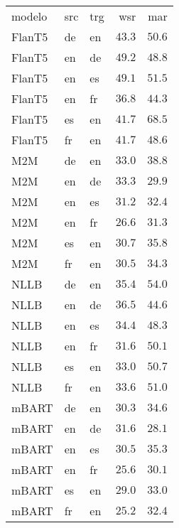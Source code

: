 \begin{tabular}{lllrr}
modelo & src & trg & wsr & mar \\
FlanT5 & de & en & $43.3$ & $50.6$ \\
FlanT5 & en & de & $49.2$ & $48.8$ \\
FlanT5 & en & es & $49.1$ & $51.5$ \\
FlanT5 & en & fr & $36.8$ & $44.3$ \\
FlanT5 & es & en & $41.7$ & $68.5$ \\
FlanT5 & fr & en & $41.7$ & $48.6$ \\
M2M & de & en & $33.0$ & $38.8$ \\
M2M & en & de & $33.3$ & $29.9$ \\
M2M & en & es & $31.2$ & $32.4$ \\
M2M & en & fr & $26.6$ & $31.3$ \\
M2M & es & en & $30.7$ & $35.8$ \\
M2M & fr & en & $30.5$ & $34.3$ \\
NLLB & de & en & $35.4$ & $54.0$ \\
NLLB & en & de & $36.5$ & $44.6$ \\
NLLB & en & es & $34.4$ & $48.3$ \\
NLLB & en & fr & $31.6$ & $50.1$ \\
NLLB & es & en & $33.0$ & $50.7$ \\
NLLB & fr & en & $33.6$ & $51.0$ \\
mBART & de & en & $30.3$ & $34.6$ \\
mBART & en & de & $31.6$ & $28.1$ \\
mBART & en & es & $30.5$ & $35.3$ \\
mBART & en & fr & $25.6$ & $30.1$ \\
mBART & es & en & $29.0$ & $33.0$ \\
mBART & fr & en & $25.2$ & $32.4$ \\
\end{tabular}
